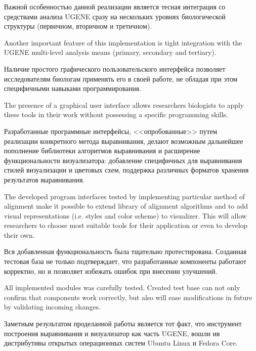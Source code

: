 \documentclass[a4paper, 12pt, titlepage, utf8]{extarticle}
\begin{document}
\begin{original}
\begin{original}
\begin{original}
Важной особенностью данной реализации является тесная интеграция со средствами
анализа UGENE сразу на нескольких уровнях биологической структуры (первичном,
вторичном и третичном).
\end{original}

Another important feature of this implementation is tight integration with the
UGENE multi-level analysis means (primary, secondary and tertiary).

\begin{original}
Наличие простого графического пользовательского интерфейса позволяет
исследователям биологам применять его в своей работе, не обладая при этом
специфичными навыками программирования.
\end{original}

The presence of a graphical user interface allows researchers biologists to
apply these tools in their work without possessing a specific programming
skills.

\begin{original}
Разработанные программные интерфейсы, <<опробованные>> путем реализации
конкретного метода выравнивания, делают возможным дальнейшее пополнение
библиотеки алгоритмов выравнивания и расширение функциональности визуализатора:
добавление специфичных для выравнивания стилей визуализации и цветовых схем,
поддержка различных форматов хранения результатов выравнивания.
\end{original}

The developed program interfaces tested by implementing particular method of
alignment make it possible to extend library of alignment algorithms and to add
visual representations (i.e. styles and color scheme) to visualizer. This will
allow researchers to choose most suitable tools for their application or even to
develop their own.

\begin{original}
Вся добавленная функциональность была тщательно протестирована. Созданная
тестовая база не только подтверждает, что разработанные компоненты работают
корректно, но и позволяет избежать ошибок при внесении улучшений.
\end{original}

All implemented modules was carefully tested. Created test base can not only
confirm that components work correctly, but also will ease modifications in
future by validating incoming changes.

\begin{original}
Заметным результатом проделанной работы является тот факт, что инструмент
построения выравнивания и визуализатор как часть UGENE, вошли ив дистрибутивы
открытых операционных систем Ubuntu Linux и Fedora Core.
\end{original}


\end{original}
\end{original}
\end{document}
